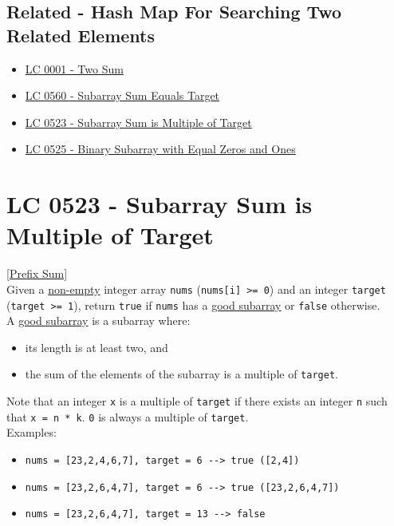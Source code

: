 \subsection*{Related - Hash Map For Searching Two Related Elements}
\begin{itemize}
\item \hyperref[lc0001]{LC 0001 - Two Sum}
\item \hyperref[lc0560]{LC 0560 - Subarray Sum Equals Target}
\item \hyperref[lc0523]{LC 0523 - Subarray Sum is Multiple of Target}
\item \hyperref[lc0525]{LC 0525 - Binary Subarray with Equal Zeros and Ones}
\end{itemize}

\section{LC 0523 - Subarray Sum is Multiple of Target}\label{lc0523}
\hyperref[sec:prefix_sum]{[Prefix Sum]}\\

Given a \ul{non-empty} integer array {\colorbox{CodeBackground}{\lstinline|nums|}} ({\colorbox{CodeBackground}{\lstinline|nums[i] >= 0|}}) and an integer {\colorbox{CodeBackground}{\lstinline|target|}} ({\colorbox{CodeBackground}{\lstinline|target >= 1|}}), return {\colorbox{CodeBackground}{\lstinline|true|}} if {\colorbox{CodeBackground}{\lstinline|nums|}} has a \ul{good subarray} or {\colorbox{CodeBackground}{\lstinline|false|}} otherwise.\\

A \ul{good subarray} is a subarray where:
\begin{itemize}
\item its length is at least two, and
\item the sum of the elements of the subarray is a multiple of {\colorbox{CodeBackground}{\lstinline|target|}}.
\end{itemize}

Note that an integer {\colorbox{CodeBackground}{\lstinline|x|}} is a multiple of {\colorbox{CodeBackground}{\lstinline|target|}} if there exists an integer {\colorbox{CodeBackground}{\lstinline|n|}} such that {\colorbox{CodeBackground}{\lstinline|x = n * k|}}. {\colorbox{CodeBackground}{\lstinline|0|}} is always a multiple of {\colorbox{CodeBackground}{\lstinline|target|}}.\\

Examples:
\begin{itemize}
\item {\colorbox{CodeBackground}{\lstinline|nums = [23,2,4,6,7], target = 6 --> true ([2,4])|}}
\item {\colorbox{CodeBackground}{\lstinline|nums = [23,2,6,4,7], target = 6 --> true ([23,2,6,4,7])|}}
\item {\colorbox{CodeBackground}{\lstinline|nums = [23,2,6,4,7], target = 13 --> false|}}
\end{itemize}

